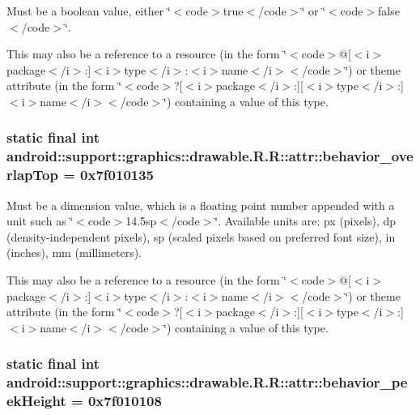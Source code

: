 Must be a boolean value, either \char`\"{}$<$code$>$true$<$/code$>$\char`\"{} or \char`\"{}$<$code$>$false$<$/code$>$\char`\"{}. 

This may also be a reference to a resource (in the form \char`\"{}$<$code$>$@\mbox{[}$<$i$>$package$<$/i$>$:\mbox{]}$<$i$>$type$<$/i$>$:$<$i$>$name$<$/i$>$$<$/code$>$\char`\"{}) or theme attribute (in the form \char`\"{}$<$code$>$?\mbox{[}$<$i$>$package$<$/i$>$:\mbox{]}\mbox{[}$<$i$>$type$<$/i$>$:\mbox{]}$<$i$>$name$<$/i$>$$<$/code$>$\char`\"{}) containing a value of this type. \hypertarget{classandroid_1_1support_1_1graphics_1_1drawable_1_1_r_1_1attr_11470ee017563d0e308ebcd0644d84c4}{
\subsubsection[{behavior\_\-overlapTop}]{\setlength{\rightskip}{0pt plus 5cm}static final int android::support::graphics::drawable.R.R::attr::behavior\_\-overlapTop = 0x7f010135}}
\label{classandroid_1_1support_1_1graphics_1_1drawable_1_1_r_1_1attr_11470ee017563d0e308ebcd0644d84c4}


Must be a dimension value, which is a floating point number appended with a unit such as \char`\"{}$<$code$>$14.5sp$<$/code$>$\char`\"{}. Available units are: px (pixels), dp (density-independent pixels), sp (scaled pixels based on preferred font size), in (inches), mm (millimeters). 

This may also be a reference to a resource (in the form \char`\"{}$<$code$>$@\mbox{[}$<$i$>$package$<$/i$>$:\mbox{]}$<$i$>$type$<$/i$>$:$<$i$>$name$<$/i$>$$<$/code$>$\char`\"{}) or theme attribute (in the form \char`\"{}$<$code$>$?\mbox{[}$<$i$>$package$<$/i$>$:\mbox{]}\mbox{[}$<$i$>$type$<$/i$>$:\mbox{]}$<$i$>$name$<$/i$>$$<$/code$>$\char`\"{}) containing a value of this type. \hypertarget{classandroid_1_1support_1_1graphics_1_1drawable_1_1_r_1_1attr_71b202eec31b48b0c0eeda5bdcf08a75}{
\subsubsection[{behavior\_\-peekHeight}]{\setlength{\rightskip}{0pt plus 5cm}static final int android::support::graphics::drawable.R.R::attr::behavior\_\-peekHeight = 0x7f010108}}
\label{classandroid_1_1support_1_1graphics_1_1drawable_1_1_r_1_1attr_71b202eec31b48b0c0eeda5bdcf08a75}


